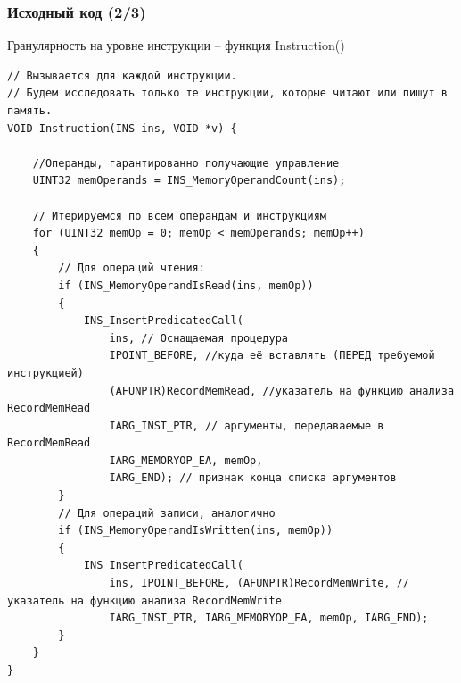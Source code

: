 \documentclass{beamer}
\begin{document}
\begin{frame}[fragile] %
\frametitle{Исходный код (2/3)}

\begin{block}{Гранулярность на уровне инструкции -- функция Instruction()}
\begin{verbatim}
// Вызывается для каждой инструкции.
// Будем исследовать только те инструкции, которые читают или пишут в память.
VOID Instruction(INS ins, VOID *v) {

    //Операнды, гарантированно получающие управление
    UINT32 memOperands = INS_MemoryOperandCount(ins);

    // Итерируемся по всем операндам и инструкциям
    for (UINT32 memOp = 0; memOp < memOperands; memOp++)
    {
        // Для операций чтения:
        if (INS_MemoryOperandIsRead(ins, memOp))
        {
            INS_InsertPredicatedCall(
                ins, // Оснащаемая процедура
                IPOINT_BEFORE, //куда её вставлять (ПЕРЕД требуемой инструкцией)
                (AFUNPTR)RecordMemRead, //указатель на функцию анализа RecordMemRead
                IARG_INST_PTR, // аргументы, передаваемые в RecordMemRead
                IARG_MEMORYOP_EA, memOp, 
                IARG_END); // признак конца списка аргументов
        }
        // Для операций записи, аналогично
        if (INS_MemoryOperandIsWritten(ins, memOp))
        {
            INS_InsertPredicatedCall(
                ins, IPOINT_BEFORE, (AFUNPTR)RecordMemWrite, //указатель на функцию анализа RecordMemWrite
                IARG_INST_PTR, IARG_MEMORYOP_EA, memOp, IARG_END);
        }
    }
}
\end{verbatim}
\end{block}

\end{frame}

\end{document}
